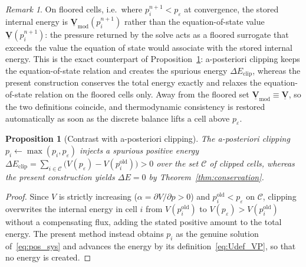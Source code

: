 \documentclass[a4paper,fleqn]{cas-sc}
\newtheorem{proposition}{Proposition}
\theoremstyle{definition}
\theoremstyle{remark}
\newtheorem{remark}{Remark}
\begin{document}
\begin{remark}
On floored cells, i.e.\ where $p^{n+1}_{i}<p_{\varepsilon}$ at convergence, the
stored internal energy is $\underline{\mathbf{V}}_{\mathrm{mod}}(p^{n+1}_{i})$ rather than
the equation-of-state value $\underline{\mathbf{V}}(p^{n+1}_{i})$: the pressure returned by
the solve acts as a floored surrogate that exceeds the value the equation of
state would associate with the stored internal energy. This is the exact
counterpart of Proposition~\ref{prop:pos_clip}: a-posteriori clipping keeps the equation-of-state
relation and creates the spurious energy $\Delta E_{\mathrm{clip}}$, whereas
the present construction conserves the total energy exactly and relaxes the
equation-of-state relation on the floored cells only. Away from the floored set
$\underline{\mathbf{V}}_{\mathrm{mod}}\equiv\underline{\mathbf{V}}$, so the two definitions coincide,
and thermodynamic consistency is restored automatically as soon as the
discrete balance lifts a cell above $p_{\varepsilon}$.
\end{remark}

\begin{proposition}[Contrast with a-posteriori clipping]
\label{prop:pos_clip}
The a-posteriori clipping $p_i\leftarrow\max(p_i,p_{\varepsilon})$ injects a spurious
positive energy
$\Delta E_{\mathrm{clip}}=\sum_{i\in\mathcal{C}}\big(V(p_{\varepsilon})-V(p_i^{\mathrm{old}})\big)>0$
over the set $\mathcal{C}$ of clipped cells, whereas the present construction yields
$\Delta E=0$ by Theorem~\ref{thm:conservation}.
\end{proposition}
\begin{proof}
Since $V$ is strictly increasing ($\alpha=\partial V/\partial p>0$) and $p_i^{\mathrm{old}}
<p_{\varepsilon}$ on $\mathcal{C}$, clipping overwrites the internal energy in cell $i$
from $V(p_i^{\mathrm{old}})$ to $V(p_{\varepsilon})>V(p_i^{\mathrm{old}})$ without a
compensating flux, adding the stated positive amount to the total energy. The present
method instead obtains $p_i$ as the genuine solution of~\eqref{eq:pos_sys} and advances
the energy by its definition~\eqref{eq:Udef_VP}, so that no energy is created.
\end{proof}
\end{document}
